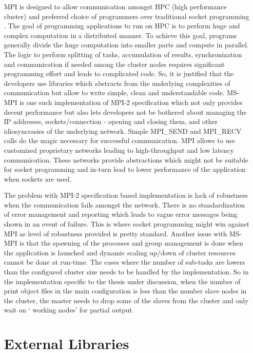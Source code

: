 MPI is designed to allow communication amongst HPC (high performance cluster) and preferred choice of programmers over traditional socket programming \cite{mpivssock}. The goal of programming applications to run on HPC is to perform huge and complex computation in a distributed manner. To achieve this goal, programs generally divide the huge computation into smaller parts and compute in parallel. The logic to perform splitting of tasks, accumulation of results, synchronization and communication if needed among the cluster nodes requires significant programming effort and leads to complicated code. So, it is justified that the developers use libraries which abstracts from the underlying complexities of communication but allow to write simple, clean and understandable code. MS-MPI is one such implementation of MPI-2 specification which not only provides decent performance but also lets developers not be bothered about managing the IP addresses, sockets/connection - opening and closing them, and other idiosyncrasies of the underlying network. Simple MPI\_SEND and MPI\_RECV calls do the magic necessary for successful communication. MPI allows to use customized proprietary networks leading to high-throughput and low latency communication. These networks provide abstractions which might not be suitable for socket programming and in-turn lead to lower performance of the application when sockets are used. \newline          

The problem with MPI-2 specification based implementation is lack of robustness when the communication fails amongst the network. There is no standardization of error management and reporting which leads to vague error messages being shown in an event of failure. This is where socket programming might win against MPI as level of robustness provided is pretty standard. Another issue with MS-MPI is that the spawning of the processes and group management is done when the application is launched and dynamic scaling up/down of cluster resources cannot be done at run-time. The cases where the number of sub-tasks are lowers than the configured cluster size needs to be handled by the implementation. So in the implementation specific to the thesis under discussion, when the number of print object files in the main configuration is less than the number slave nodes in the cluster, the master needs to drop some of the slaves from the cluster and only wait on {\lq} working nodes{\rq} for partial output. 
	
\section{External Libraries}


